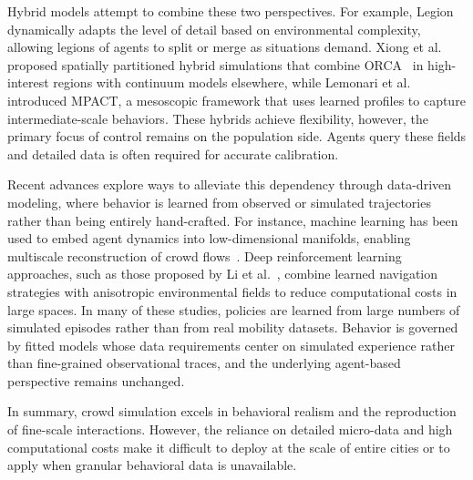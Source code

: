 Hybrid models attempt to combine these two perspectives. For example, Legion\cite{legion} dynamically adapts the level of detail based on environmental complexity, allowing legions of agents to split or merge as situations demand. Xiong et al.~\cite{xiong2010hybrid} proposed spatially partitioned hybrid simulations that combine ORCA~\cite{van2011reciprocal} in high-interest regions with continuum models elsewhere, while Lemonari et al.~\cite{lemonari2025mpact} introduced MPACT, a mesoscopic framework that uses learned profiles to capture intermediate-scale behaviors. These hybrids achieve flexibility, however, the primary focus of
control remains on the population side. Agents query these fields and detailed data is often required for accurate calibration.

Recent advances explore ways to alleviate this dependency through data-driven modeling, where behavior is learned from observed or simulated trajectories rather than being entirely hand-crafted. For instance, machine learning has been used to embed agent dynamics into low-dimensional manifolds, enabling multiscale reconstruction of crowd flows~\cite{alvarez2025quationfree}. 
Deep reinforcement learning approaches, such as those proposed by Li et al.~\cite{Li2025efficienteCrowdSim}, combine learned navigation strategies with anisotropic environmental fields to reduce computational costs in large spaces. 
In many of these studies, policies are learned from large numbers of simulated episodes rather than from real mobility datasets. Behavior is governed by fitted models whose data requirements center on simulated experience rather than fine-grained observational traces, and the underlying agent-based perspective remains unchanged.

In summary, crowd simulation excels in behavioral realism and the reproduction of fine-scale interactions. However, the reliance on detailed micro-data and high computational costs make it difficult to deploy at the scale of entire cities or to apply when granular behavioral data is unavailable.


